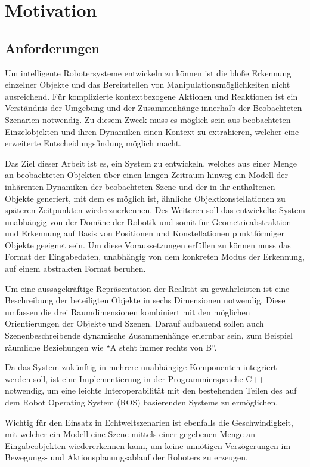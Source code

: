 \chapter{Motivation}\label{ch:motivation}

\section{Anforderungen}
Um intelligente Robotersysteme entwickeln zu können ist die bloße Erkennung einzelner Objekte und das Bereitstellen von Manipulationsmöglichkeiten nicht ausreichend.
Für komplizierte kontextbezogene Aktionen und Reaktionen ist ein Verständnis der Umgebung und der  Zusammenhänge innerhalb der Beobachteten Szenarien notwendig.
Zu diesem Zweck muss es möglich sein aus beobachteten Einzelobjekten und ihren Dynamiken einen Kontext zu extrahieren, welcher eine erweiterte Entscheidungsfindung möglich macht.

Das Ziel dieser Arbeit ist es, ein System zu entwickeln, welches aus einer Menge an beobachteten Objekten über einen langen Zeitraum hinweg ein Modell der inhärenten Dynamiken der beobachteten Szene und der in ihr enthaltenen Objekte generiert, mit dem es möglich ist, ähnliche Objektkonstellationen zu späteren Zeitpunkten wiederzuerkennen.
Des Weiteren soll das entwickelte System unabhängig von der Domäne der Robotik und somit für Geometrieabstraktion und Erkennung auf Basis von Positionen und Konstellationen punktförmiger Objekte geeignet sein.
Um diese Voraussetzungen erfüllen zu können muss das Format der Eingabedaten, unabhängig von dem konkreten Modus der Erkennung, auf einem abstrakten Format beruhen.

Um eine aussagekräftige Repräsentation der Realität zu gewährleisten ist eine Beschreibung der beteiligten Objekte in sechs Dimensionen notwendig.
Diese umfassen die drei Raumdimensionen kombiniert mit den möglichen Orientierungen der Objekte und Szenen.
Darauf aufbauend sollen auch Szenenbeschreibende dynamische Zusammenhänge erlernbar sein, zum Beispiel räumliche Beziehungen wie "`A steht immer rechts von B"'.

Da das System zukünftig in mehrere unabhängige Komponenten integriert werden soll, ist eine Implementierung in der Programmiersprache C++ notwendig, um eine leichte Interoperabilität mit den bestehenden Teilen des auf dem Robot Operating System (ROS) basierenden Systems zu ermöglichen.

Wichtig für den Einsatz in Echtweltszenarien ist ebenfalls die Geschwindigkeit, mit welcher ein Modell eine Szene mittels einer gegebenen Menge an Eingabeobjekten wiedererkennen kann, um keine unnötigen Verzögerungen im Bewegungs- und Aktionsplanungsablauf der Roboters zu erzeugen.

